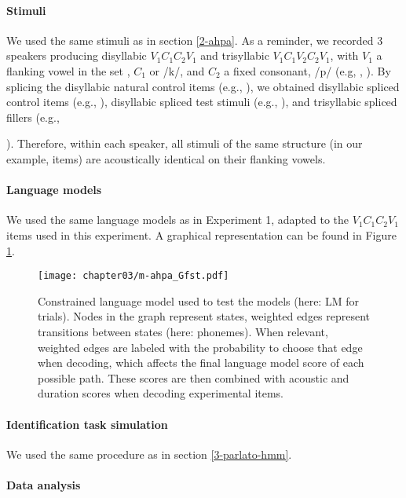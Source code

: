 \paragraph{Stimuli}
We used the same stimuli as in section \ref{2-ahpa}. As a reminder, we recorded 3 speakers producing disyllabic $V_{1}C_{1}C_{2}V_{1}$ and trisyllabic $V_{1}C_{1}V_{2}C_{2}V_{1}$, with $V_{1}$ a flanking vowel in the set , $C_{1}$  or /k/, and $C_{2}$ a fixed consonant, /p/ (e.g, , ). By splicing the disyllabic natural control items (e.g., ), we obtained disyllabic spliced control items (e.g., \texorpdfstring{}{}), disyllabic spliced test stimuli (e.g., \texorpdfstring{}{}), and trisyllabic spliced fillers (e.g., {). Therefore, within each speaker, all stimuli of the same structure (in our example,  items) are acoustically identical on their flanking vowels.
  
\paragraph{Language models}
We used the same language models as in Experiment 1, adapted to the $V_{1}C_{1}C_{2}V_{1}$ items used in this experiment. A graphical representation can be found in Figure \ref{fig:m-ahpa_G}.
  
\begin{figure}[htb]
    \centering
    \texttt{[image: chapter03/m-ahpa\_Gfst.pdf]}
    \caption{Constrained language model used to test the models (here: LM for  trials). Nodes in the graph represent states, weighted edges represent transitions between states (here: phonemes). When relevant, weighted edges are labeled with the probability to choose that edge when decoding, which affects the final language model score of each possible path. These scores are then combined with acoustic and duration scores when decoding experimental items.}
    \label{fig:m-ahpa_G}
\end{figure}
  
\paragraph{Identification task simulation}
We used the same procedure as in section \ref{3-parlato-hmm}.

\paragraph{{\color{red}Data analysis}}

}
